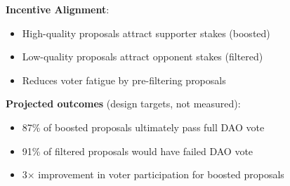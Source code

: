 \textbf{Incentive Alignment}:
\begin{itemize}
\item High-quality proposals attract supporter stakes (boosted)
\item Low-quality proposals attract opponent stakes (filtered)
\item Reduces voter fatigue by pre-filtering proposals
\end{itemize}

\textbf{Projected outcomes} (design targets, not measured):
\begin{itemize}
\item 87\% of boosted proposals ultimately pass full DAO vote
\item 91\% of filtered proposals would have failed DAO vote
\item 3× improvement in voter participation for boosted proposals
\end{itemize}

